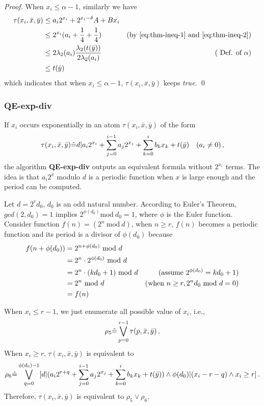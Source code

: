 \begin{proof}
When $x_i \le \alpha-1$, similarly we have
\begin{align}
    \tau(x_i,\bar{x},\bar{y})\notag 
    & \le  a_i 2^{x_i} + 2^{x_i -\delta}A  + Bx_i &  \notag \\
    & \le  2^{x_i}(a_i +\frac{1}{4} +\frac{1}{4}) &(\mbox{by \eqref{eq:thm-ineq-1} and  \eqref{eq:thm-ineq-2}}) \notag \\
   & \le  2\lambda_2(a_i)\frac{\lambda_2(t(\bar{y}))}{2\lambda_2(a_i)} &  (\mbox{ Def. of } \alpha) \notag \\
   &  \le  t(\bar{y}) & \notag 
\end{align}
which indicates that when  $x_i \le \alpha-1$, $\tau(x_i,\bar{x},\bar{y})$ keeps \textit{true}. \qed 
\end{proof}

\subsubsection{QE-exp-div}

If $x_i$ occurs exponentially in an atom $\tau(x_i,\bar{x},\bar{y})$ of the form
$$\tau(x_i,\bar{x},\bar{y}) \hat{=}  d| a_i 2^{x_i}+\sum_{j=0}^{i-1} a_j 2^{x_j} + \sum_{k=0}^{i} b_k x_k+t(\bar{y}) \quad (a_i \neq 0)\,,$$
the algorithm \textbf{QE-exp-div} outputs an equivalent formula without $2^{x_i}$ terms.
The idea is that $a_i 2^x$ modulo $d$ is a periodic function when $x$ is large enough and the period can be computed.

Let $d = 2^rd_0$, $d_0$ is an odd natural number. 
According to Euler's Theorem, 
$gcd(2,d_0)=1$ implies
$2^{\phi(d_0)} \text{mod}\ d_0 = 1$,
where $\phi$ is the Euler function.
Consider function $f(n)=(2^n\ \text{mod} \ d)$,
when $n\ge r$, 
$f(n)$ becomes a periodic function and its period is a divisor of $\phi(d_0)$ because
\begin{align}
    f(n+\phi(d_0)) 
    &=2^{n+\phi(d_0)}\ \text{mod}\ d &\notag\\
    &=2^n\cdot 2^{\phi(d_0)}\ \text{mod}\ d &\notag\\
    &=2^n\cdot (k d_0 + 1) \ \text{mod}\ d &
    (\mbox{assume } 2^{\phi(d_0)}=k d_0 +1) \notag \\
    &= 2^n \ \text{mod}\ d &
    (\mbox{when } n\ge r, 2^n d_0\ \text{mod}\ d = 0 )\notag\\
    &= f(n) \notag
\end{align}

When $x_i\le r-1$, we just enumerate all possible value of $x_i$, i.e., 
$$\rho_5 \hat{=} \bigvee_{p=0}^{r-1} \tau(p,\bar{x},\bar{y})\,.$$
When $x_i\ge r$, $\tau(x_i,\bar{x},\bar{y})$ is equivalent to
$$
\rho_6 \hat{=} \bigvee_{q=0}^{\phi(d_0)-1} [d|(a_i 2^{r+q}+\sum_{j=0}^{i-1} a_j 2^{x_j}
+  \sum_{k=0}^{i} b_k x_k+t(\bar{y})) \wedge \phi(d_0)|(x_i-r-q) \wedge x_i \ge r] \,.
$$
            Therefore,  $\tau(x_i,\bar{x},\bar{y})$ is equivalent to  $\rho_5 \vee \rho_6$.

